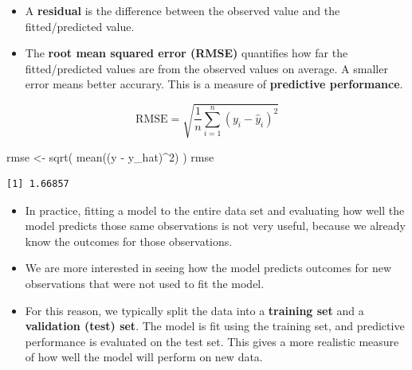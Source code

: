 \documentclass[
  letterpaper,
  DIV=11,
  numbers=noendperiod]{scrreprt}
\newenvironment{Shaded}{\begin{snugshade}}{\end{snugshade}}
\newcommand{\DecValTok}[1]{\textcolor[rgb]{0.68,0.00,0.00}{#1}}
\newcommand{\FunctionTok}[1]{\textcolor[rgb]{0.28,0.35,0.67}{#1}}
\newcommand{\NormalTok}[1]{\textcolor[rgb]{0.00,0.23,0.31}{#1}}
\newcommand{\OtherTok}[1]{\textcolor[rgb]{0.00,0.23,0.31}{#1}}
\newcommand{\SpecialCharTok}[1]{\textcolor[rgb]{0.37,0.37,0.37}{#1}}
\providecommand{\tightlist}{%
  \setlength{\itemsep}{0pt}\setlength{\parskip}{0pt}}\usepackage{longtable,booktabs,array}
\begin{document}
\begin{itemize}
\tightlist
\item
  A \textbf{residual} is the difference between the observed value and
  the fitted/predicted value.
\end{itemize}

\begin{Shaded}
\end{Shaded}

\begin{itemize}
\tightlist
\item
  The \textbf{root mean squared error (RMSE)} quantifies how far the
  fitted/predicted values are from the observed values on average. A
  smaller error means better accurary. This is a measure of
  \textbf{predictive performance}.
\end{itemize}

\[\text{RMSE} = \sqrt{\dfrac{1}{n} \sum_{i = 1}^n (y_i - \hat{y}_i)^2}\]

\begin{Shaded}
\begin{Highlighting}[]
\NormalTok{rmse }\OtherTok{\textless{}{-}} \FunctionTok{sqrt}\NormalTok{( }\FunctionTok{mean}\NormalTok{((y }\SpecialCharTok{{-}}\NormalTok{ y\_hat)}\SpecialCharTok{\^{}}\DecValTok{2}\NormalTok{) )}
\NormalTok{rmse}
\end{Highlighting}
\end{Shaded}

\begin{verbatim}
[1] 1.66857
\end{verbatim}

\begin{itemize}
\item
  In practice, fitting a model to the entire data set and evaluating how
  well the model predicts those same observations is not very useful,
  because we already know the outcomes for those observations.
\item
  We are more interested in seeing how the model predicts outcomes for
  new observations that were not used to fit the model.
\item
  For this reason, we typically split the data into a \textbf{training
  set} and a \textbf{validation (test) set}. The model is fit using the
  training set, and predictive performance is evaluated on the test set.
  This gives a more realistic measure of how well the model will perform
  on new data.
\end{itemize}
\end{document}

